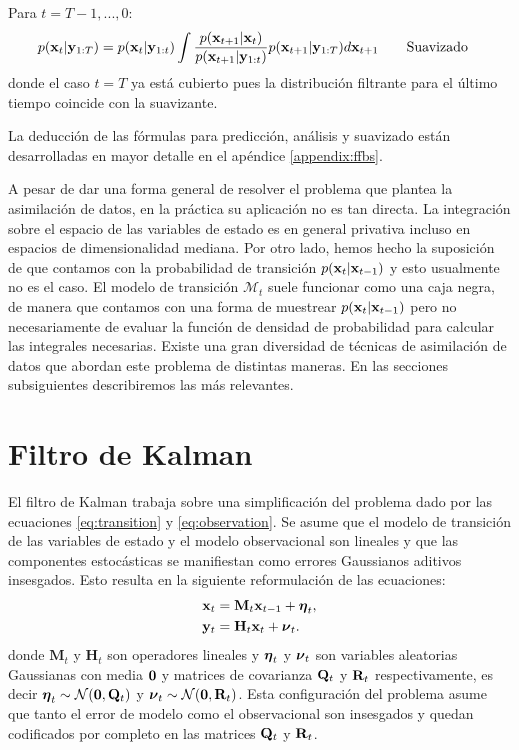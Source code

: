 Para $t = T-1, ..., 0$:
\begin{align}
    p(\mathbf{x}_t | \mathbf{y}_{1:T}) = p(\mathbf{x}_t |\mathbf{y}_{1:t}) \int \frac{p(\mathbf{x}_{t+1} | \mathbf{x}_t)}
    {p(\mathbf{x}_{t+1} |\mathbf{y}_{1:t})}
    p(\mathbf{x}_{t+1} | \mathbf{y}_{1:T}) d\mathbf{x}_{t+1} \hspace{2em} &\text{Suavizado}
\end{align}
donde el caso $t = T$ ya está cubierto pues la distribución filtrante para el último tiempo coincide con la suavizante.

La deducción de las fórmulas para predicción, análisis y suavizado están desarrolladas en mayor detalle en el apéndice \ref{appendix:ffbs}.

A pesar de dar una forma general de resolver el problema que plantea la asimilación de datos, en la práctica su aplicación no es tan directa. La integración sobre el espacio de las variables de estado es en general privativa incluso en espacios de dimensionalidad mediana. Por otro lado, hemos hecho la suposición de que contamos con la probabilidad de transición $p(\mathbf{x}_t | \mathbf{x}_{t-1})$ y esto usualmente no es el caso. El modelo de transición $\mathcal{M}_t$ suele funcionar como una caja negra, de manera que contamos con una forma de muestrear $p(\mathbf{x}_t | \mathbf{x}_{t-1})$ pero no necesariamente de evaluar la función de densidad de probabilidad para calcular las integrales necesarias. Existe una gran diversidad de técnicas de asimilación de datos que abordan este problema de distintas maneras. En las secciones subsiguientes describiremos las más relevantes.

\section{Filtro de Kalman}\label{sec:kf}

El filtro de Kalman trabaja sobre una simplificación del problema dado por las ecuaciones \ref{eq:transition} y \ref{eq:observation}. Se asume que el modelo de transición de las variables de estado y el modelo observacional son lineales y que las componentes estocásticas se manifiestan como errores Gaussianos aditivos insesgados. Esto resulta en la siguiente reformulación de las ecuaciones:
\begin{align}
    \mathbf{x}_t &= \mathbf{M}_t \mathbf{x}_{t-1} + \mbox{\boldmath$ \eta $}_t, \label{eq:kf_forward}\\
    \mathbf{y}_t &= \mathbf{H}_t \mathbf{x}_t + \mbox{\boldmath$ \nu $}_t. \label{eq:kf_observational}
\end{align}
donde $\mathbf{M}_t$ y $\mathbf{H}_t$ son operadores lineales y $\mbox{\boldmath$ \eta $}_t$ y $\mbox{\boldmath$ \nu $}_t$ son variables aleatorias Gaussianas con media $\mathbf{0}$ y matrices de covarianza $\mathbf{Q}_t$ y $\mathbf{R}_t$ respectivamente, es decir $\mbox{\boldmath$ \eta $}_t \sim \mathcal{N}(\mathbf{0}, \mathbf{Q}_t)$ y $\mbox{\boldmath$ \nu $}_t \sim \mathcal{N}(\mathbf{0}, \mathbf{R}_t)$. Esta configuración del problema asume que tanto el error de modelo como el observacional son insesgados y quedan codificados por completo en las matrices $\mathbf{Q}_t$ y $\mathbf{R}_t$.

